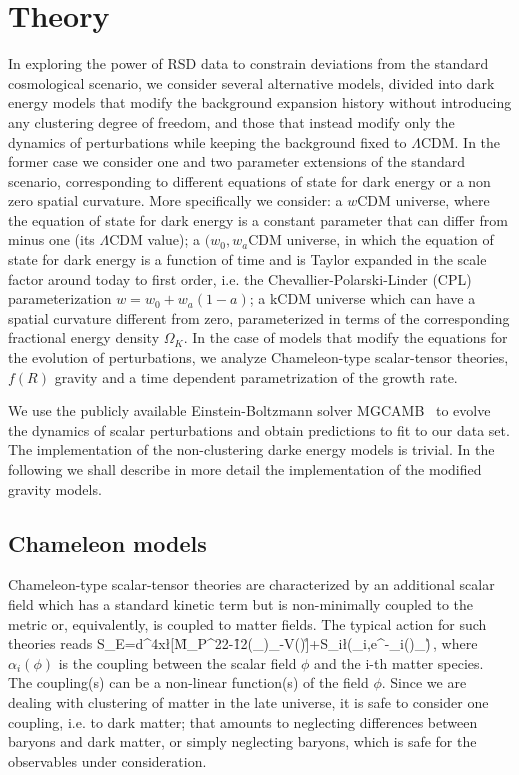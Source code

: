 \section{Theory}
\label{sec:theory}

In exploring the power of RSD data to constrain deviations from the standard cosmological scenario,  we consider several alternative models,  divided into dark energy models that modify the background expansion history without introducing any clustering degree of freedom, and those that instead modify only the dynamics of perturbations while keeping the background fixed to $\Lambda$CDM.  In the former case we consider one and two parameter extensions of the standard scenario, corresponding to different equations of state for dark energy or a non zero spatial curvature. More specifically we consider: a $w$CDM universe, where the equation of state for dark energy is a constant parameter that can differ from minus one (its $\Lambda$CDM value); a $(w_0,w_a$CDM universe, in which the equation of state for dark energy is a function of time and is Taylor expanded  in the scale factor around today to first order, i.e.  the Chevallier-Polarski-Linder (CPL) parameterization $w=w_0+w_a(1-a)$; a kCDM universe which can have a spatial curvature different from zero, parameterized in terms of the corresponding fractional energy density $\Omega_{K}$. In the case of models that modify the equations for the evolution of perturbations, we analyze Chameleon-type scalar-tensor theories, $f(R)$ gravity and a time dependent parametrization of the growth rate. 

We use the publicly available Einstein-Boltzmann solver MGCAMB~\cite{CAMB} to evolve the dynamics of scalar perturbations and obtain predictions to fit to our data set. The implementation of the non-clustering darke energy models is trivial. In the following we shall describe in more detail the implementation of the modified gravity models. 

\subsection{Chameleon models}
Chameleon-type scalar-tensor theories are characterized by  an additional scalar field which has a standard kinetic term but is non-minimally coupled to the metric or, equivalently, is coupled to matter fields. The typical action for such theories reads
\be\label{Einstein_action_text}
S_E=\int d^4x\l[\f{M_P^2}{2}-\f{1}{2}(\tilde{\nabla}_{\mu}\phi)\tilde{\nabla}_{\nu}\phi-V(\phi)\r]+S_i\l(\chi_i,e^{-\kappa\alpha_i(\phi)}_{\mu\nu}\r)\,,
\ee
where $\alpha_i(\phi)$ is the coupling between the scalar field $\phi$ and the i-th matter species. The coupling(s) can be a non-linear function(s) of the field $\phi$. Since we are dealing with clustering of matter in the late universe, it is safe to consider one coupling, i.e. to dark matter; that amounts to neglecting differences between baryons and dark matter, or simply neglecting baryons, which is safe for the observables under consideration. 

